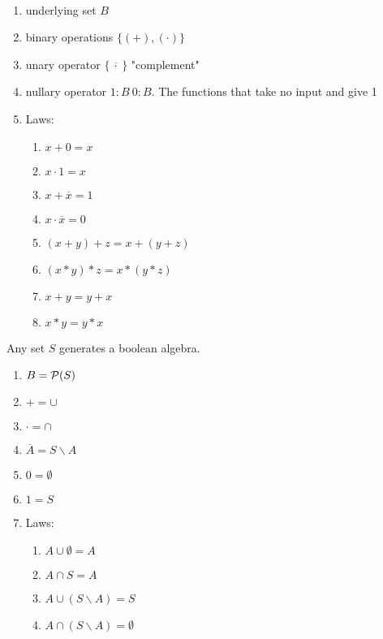 \documentclass[12pt]{article}
\begin{document}
\bboxdefn
\begin{defn}\ 
    \begin{enumerate}
        \item underlying set \(B\)
        \item binary operations \(\{(+),(\cdot)\}\)
        \item unary operator \(\{\overline{\ \cdot\ }\}\) "complement"
        \item nullary operator \(1:B\ 0:B\). The functions that take no input and give 1
        \item Laws:
            \begin{enumerate}
                \item \(x+0=x\)
                \item \(x\cdot 1=x\)
                \item \(x+\overline x=1\)
                \item \(x\cdot\overline x=0\)
                \item \((x+y)+z=x+(y+z)\)
                \item \((x*y)* z=x*(y*z)\)
                \item \(x+y=y+x\)
                \item \(x*y=y*x\)
            \end{enumerate}
    \end{enumerate}
\end{defn}
\ebox


\bboxexam
\begin{exam}
    Any set \(S\) generates a boolean algebra. 
    \begin{enumerate}
        \item \(B=\mathcal P(S)\)
        \item \(+=\cup\)
        \item \(\cdot=\cap\)
        \item \(\overline{A}=S\backslash A\)
        \item \(0=\emptyset\)
        \item \(1=S\)
        \item Laws:
            \begin{enumerate}
                \item \(A\cup\emptyset=A\)
                \item \(A\cap S=A\)
                \item \(A\cup(S\backslash A)=S\)
                \item \(A\cap(S\backslash A)=\emptyset\)
            \end{enumerate}
    \end{enumerate}
\end{exam}
\ebox
\end{document}
